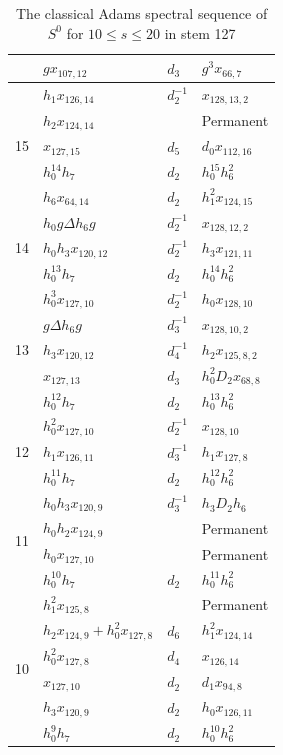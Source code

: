 \begin{table}[htbp]
{\begin{tabular}{|c|l|l|l|}
 & $gx_{107,12}$ & $d_{3}$ & $g^3x_{66,7}$ \\\hline\hline
\multirow{5}{*}{15} & $h_1x_{126,14}$ & $d_{2}^{-1}$ & $x_{128,13,2}$ \\\cline{2-4}
 & $h_2x_{124,14}$ & & Permanent \\\cline{2-4}
 & $x_{127,15}$ & $d_{5}$ & $d_0x_{112,16}$ \\\cline{2-4}
 & $h_0^{14}h_7$ & $d_{2}$ & $h_0^{15}h_6^2$ \\\cline{2-4}
 & $h_6x_{64,14}$ & $d_{2}$ & $h_1^2x_{124,15}$ \\\hline\hline
\multirow{3}{*}{14} & $h_0g\Delta h_6g$ & $d_{2}^{-1}$ & $x_{128,12,2}$ \\\cline{2-4}
 & $h_0h_3x_{120,12}$ & $d_{2}^{-1}$ & $h_3x_{121,11}$ \\\cline{2-4}
 & $h_0^{13}h_7$ & $d_{2}$ & $h_0^{14}h_6^2$ \\\hline\hline
\multirow{5}{*}{13} & $h_0^3x_{127,10}$ & $d_{2}^{-1}$ & $h_0x_{128,10}$ \\\cline{2-4}
 & $g\Delta h_6g$ & $d_{3}^{-1}$ & $x_{128,10,2}$ \\\cline{2-4}
 & $h_3x_{120,12}$ & $d_{4}^{-1}$ & $h_2x_{125,8,2}$ \\\cline{2-4}
 & $x_{127,13}$ & $d_{3}$ & $h_0^2D_2x_{68,8}$ \\\cline{2-4}
 & $h_0^{12}h_7$ & $d_{2}$ & $h_0^{13}h_6^2$ \\\hline\hline
\multirow{3}{*}{12} & $h_0^2x_{127,10}$ & $d_{2}^{-1}$ & $x_{128,10}$ \\\cline{2-4}
 & $h_1x_{126,11}$ & $d_{3}^{-1}$ & $h_1x_{127,8}$ \\\cline{2-4}
 & $h_0^{11}h_7$ & $d_{2}$ & $h_0^{12}h_6^2$ \\\hline\hline
\multirow{4}{*}{11} & $h_0h_3x_{120,9}$ & $d_{3}^{-1}$ & $h_3D_2h_6$ \\\cline{2-4}
 & $h_0h_2x_{124,9}$ & & Permanent \\\cline{2-4}
 & $h_0x_{127,10}$ & & Permanent \\\cline{2-4}
 & $h_0^{10}h_7$ & $d_{2}$ & $h_0^{11}h_6^2$ \\\hline\hline
\multirow{6}{*}{10} & $h_1^2x_{125,8}$ & & Permanent \\\cline{2-4}
 & $h_2x_{124,9}+h_0^2x_{127,8}$ & $d_{6}$ & $h_1^2x_{124,14}$ \\\cline{2-4}
 & $h_0^2x_{127,8}$ & $d_{4}$ & $x_{126,14}$ \\\cline{2-4}
 & $x_{127,10}$ & $d_{2}$ & $d_1x_{94,8}$ \\\cline{2-4}
 & $h_3x_{120,9}$ & $d_{2}$ & $h_0x_{126,11}$ \\\cline{2-4}
 & $h_0^9h_7$ & $d_{2}$ & $h_0^{10}h_6^2$ \\\hline
  \end{tabular}}
\caption{The classical Adams spectral sequence of $S^0$ for $10 \le s \le 20$ in stem 127}
\label{Table:S127.20}
\end{table}

